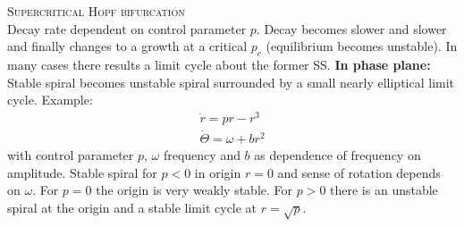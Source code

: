\textsc{Supercritical Hopf bifurcation}\\
Decay rate dependent on control parameter $p$. Decay becomes slower and slower and finally changes to a growth at a critical $p_c$ (equilibrium becomes unstable). In many cases there results a limit cycle about the former SS. \textbf{In phase plane:} Stable spiral becomes unstable spiral surrounded by a small nearly elliptical limit cycle.
Example:
\begin{align*}
\dot{r}=pr-r^3\\
\dot{\Theta}=\omega+br^2
\end{align*}
with control parameter $p$, $\omega$ frequency and $b$ as dependence of frequency on amplitude. Stable spiral for $p<0$ in origin $r=0$ and sense of rotation depends on $\omega$. For $p=0$ the origin is very weakly stable. For $p>0$ there is an unstable spiral at the origin and a stable limit cycle at $r=\sqrt{p}$.








